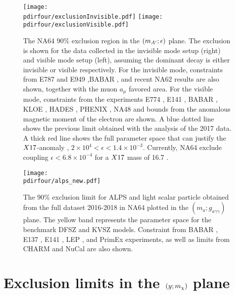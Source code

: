 \begin{figure}[tbh!]
  \centering
  \texttt{[image: \\pdirfour/exclusionInvisible.pdf]}
  \texttt{[image: \\pdirfour/exclusionVisible.pdf]}
  \caption[Exclusion limits in the $\dmplane$]{The NA64 90\% exclusion region in the $\dmplane$ plane. The exclusion is shown for the data collected in the invisible mode setup (right) and visible mode setup (left), assuming the dominant decay is either invisible or visible respectively\cite{NA64:2019imj,Banerjee:2019hmi}. For the invisible mode, constraints from E787 and E949 \cite{PhysRevD.89.095006,Essig:2013vha},BABAR \cite{PhysRevLett.119.131804}, and recent NA62 results \cite{CortinaGil:2019nuo} are also shown, together with the muon $a_{\mu}$ favored area. For the visible mode, constraints from the experiments E774 \cite{PhysRevLett.67.2942}, E141 \cite{PhysRevLett.59.755}, BABAR \cite{babar1}, KLOE \cite{kloe2}, HADES \cite{hades}, PHENIX \cite{phenix}, NA48 \cite{na48} and bounds from the anomalous magnetic moment of the electron \cite{PhysRevD.89.095006} are shown. A blue dotted line shows the previous limit obtained with the analysis of the 2017 data. A thick red line shows the full parameter space that can justify the $X17$-anomaly \cite{PhysRevD.95.035017}, $2 \times 10^{4} < \epsilon< 1.4 \times 10^{-3}$. Currently, NA64 exclude coupling $\epsilon < 6.8 \times 10^{-4}$ for a $X17$ mass of 16.7 \mev.}
  \label{fig:exclusion-dmplane}
\end{figure}

\begin{figure}[bth!]
  \centering
  \texttt{[image: \\pdirfour/alps\_new.pdf]}
  \caption[Exclusion limits in the $(m_{a};g_{a \gamma \gamma})$ plane for ALPS and light scalar]{The 90\% exclusion limit for ALPS and light scalar particle obtained from the full dataset 2016-2018 in NA64 plotted in the $(m_{a};g_{a \gamma \gamma})$ plane. The yellow band represents the parameter space for the benchmark DFSZ \cite{DINE1981199} and KVSZ \cite{PhysRevLett.43.103} models. Constraint from BABAR \cite{Dolan:2017osp}, E137 \cite{e137}, E141 \cite{blum}, LEP , and PrimEx \cite{PhysRevLett.123.071801} experiments, as well as limits from CHARM \cite{BERGSMA1985458} and NuCal \cite{Dobrich:2019dxc} are also shown.}
  \label{fig:exclusion-dmplane-alps}
\end{figure}

\newpage

\section{Exclusion limits in the $(y;m_{\chi})$ plane}
\label{ch4:sec:exclusion-limits-y}

